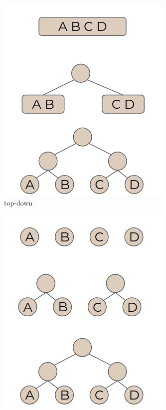 \documentclass[11pt,a4paper]{extarticle}
\begin{document}
			\begin{figure}[ht]
				\centering
				\begin{subfigure}{1.5in}
					\includegraphics[width=\textwidth]{bvhcreate1}					
					\caption{top-down}
					\label{bvhcreate1}					
				\end{subfigure}
				\begin{subfigure}{1.5in}
					\includegraphics[width=\textwidth]{bvhcreate2}					

\end{subfigure}
\end{figure}
\end{document}

